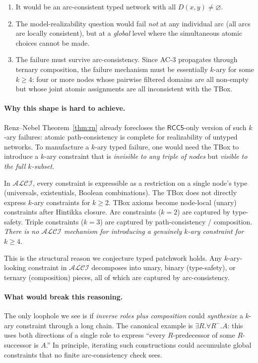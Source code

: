 \documentclass[11pt]{article}
\theoremstyle{definition}
\theoremstyle{remark}
\begin{document}
\begin{enumerate}
  \item It would be an arc-consistent typed network with all
    $D(x, y) \neq \varnothing$.
  \item The model-realizability question would fail \emph{not}
    at any individual arc (all arcs are locally consistent), but
    at a \emph{global} level where the simultaneous atomic
    choices cannot be made.
  \item The failure must survive arc-consistency.  Since AC-3
    propagates through ternary composition, the failure
    mechanism must be essentially $k$-ary for some $k \geq 4$:
    four or more nodes whose pairwise filtered domains are all
    non-empty but whose joint atomic assignments are all
    inconsistent with the TBox.
\end{enumerate}

\paragraph{Why this shape is hard to achieve.}  Renz--Nebel
Theorem~\ref{thm:rn} already forecloses the $\mathsf{RCC5}$-only
version of such $k$-ary failures: atomic path-consistency is
complete for realizability of untyped networks.  To manufacture a
$k$-ary typed failure, one would need the TBox to introduce a
$k$-ary constraint that is \emph{invisible to any triple of nodes}
but \emph{visible to the full $k$-subset}.

In $\mathcal{ALCI}$, every constraint is expressible as a
restriction on a single node's type (universals, existentials,
Boolean combinations).  The TBox does not directly express
$k$-ary constraints for $k \geq 2$.  TBox axioms become
node-local (unary) constraints after Hintikka closure.  Arc
constraints ($k = 2$) are captured by type-safety.  Triple
constraints ($k = 3$) are captured by path-consistency /
composition.  \emph{There is no $\mathcal{ALCI}$ mechanism for
introducing a genuinely $k$-ary constraint for $k \geq 4$.}

This is the structural reason we conjecture typed patchwork holds.
Any $k$-ary-looking constraint in $\mathcal{ALCI}$ decomposes into
unary, binary (type-safety), or ternary (composition) pieces, all
of which are captured by arc-consistency.

\paragraph{What would break this reasoning.}  The only loophole we
see is if \emph{inverse roles plus composition} could
\emph{synthesize} a $k$-ary constraint through a long chain.  The
canonical example is $\exists R. \forall R^{-}. A$: this uses both
directions of a single role to express ``every $R$-predecessor of
some $R$-successor is $A$.''  In principle, iterating such
constructions could accumulate global constraints that no finite
arc-consistency check sees.
\end{document}
